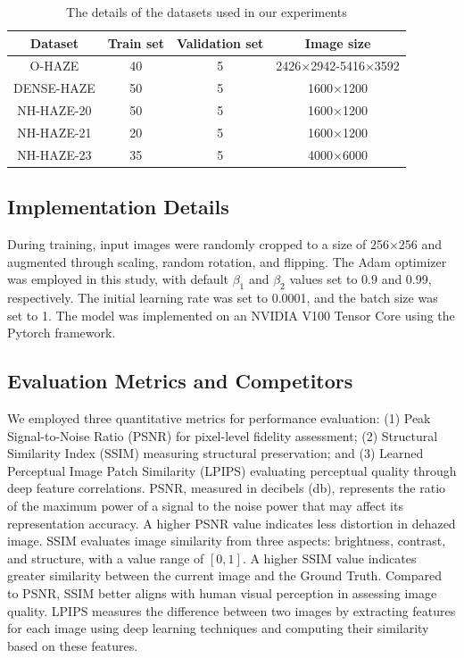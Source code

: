 \documentclass[journal]{IEEEtran}
\begin{document}
\begin{table}
	\begin{center}
		\caption{The details of the datasets used in our experiments}
		\label{table_dataset}
		\begin{tabular}{ c | c | c | c }
			\hline
			Dataset    & Train set & Validation set & Image size          \\
			\hline
			O-HAZE     & 40        & 5              & 2426×2942-5416×3592 \\
			DENSE-HAZE & 50        & 5              & 1600×1200           \\
			NH-HAZE-20 & 50        & 5              & 1600×1200           \\
			NH-HAZE-21 & 20        & 5              & 1600×1200           \\
			NH-HAZE-23 & 35        & 5              & 4000×6000           \\
			\hline
		\end{tabular}
	\end{center}
\end{table}

\subsection{Implementation Details}
During training, input images were randomly cropped to a size of 256×256 and augmented through scaling, random rotation, and flipping. The Adam optimizer~\cite{kingma2014adam} was employed in this study, with default $\beta_{1}$ and $\beta_{2}$ values set to 0.9 and 0.99, respectively. The initial learning rate was set to 0.0001, and the batch size was set to 1. The model was implemented on an NVIDIA V100 Tensor Core using the Pytorch framework.

\subsection{Evaluation Metrics and Competitors}
We employed three quantitative metrics for performance evaluation: (1) Peak Signal-to-Noise Ratio (PSNR) for pixel-level fidelity assessment; (2) Structural Similarity Index (SSIM)\cite{wang2004image} measuring structural preservation; and (3) Learned Perceptual Image Patch Similarity (LPIPS)\cite{zhang2018unreasonable} evaluating perceptual quality through deep feature correlations. PSNR, measured in decibels (db), represents the ratio of the maximum power of a signal to the noise power that may affect its representation accuracy. A higher PSNR value indicates less distortion in dehazed image. SSIM evaluates image similarity from three aspects: brightness, contrast, and structure, with a value range of $[0,1]$. A higher SSIM value indicates greater similarity between the current image and the Ground Truth. Compared to PSNR, SSIM better aligns with human visual perception in assessing image quality. LPIPS measures the difference between two images by extracting features for each image using deep learning techniques and computing their similarity based on these features.
\end{document}

